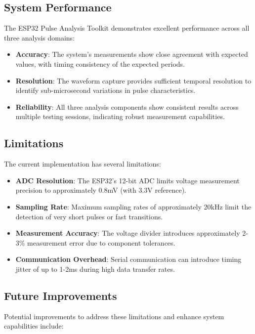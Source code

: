 \documentclass[conference]{IEEEtran}
\begin{document}
\subsection{System Performance}
The ESP32 Pulse Analysis Toolkit demonstrates excellent performance across all three analysis domains:

\begin{itemize}
    \item \textbf{Accuracy}: The system's measurements show close agreement with expected values, with timing consistency of the expected periods.
    
    \item \textbf{Resolution}: The waveform capture provides sufficient temporal resolution to identify sub-microsecond variations in pulse characteristics.
    
    \item \textbf{Reliability}: All three analysis components show consistent results across multiple testing sessions, indicating robust measurement capabilities.
\end{itemize}

\subsection{Limitations}
The current implementation has several limitations:

\begin{itemize}
    \item \textbf{ADC Resolution}: The ESP32's 12-bit ADC limits voltage measurement precision to approximately 0.8mV (with 3.3V reference).
    
    \item \textbf{Sampling Rate}: Maximum sampling rates of approximately 20kHz limit the detection of very short pulses or fast transitions.
    
    \item \textbf{Measurement Accuracy}: The voltage divider introduces approximately 2-3\% measurement error due to component tolerances.
    
    \item \textbf{Communication Overhead}: Serial communication can introduce timing jitter of up to 1-2ms during high data transfer rates.
\end{itemize}

\subsection{Future Improvements}
Potential improvements to address these limitations and enhance system capabilities include:
\end{document}

